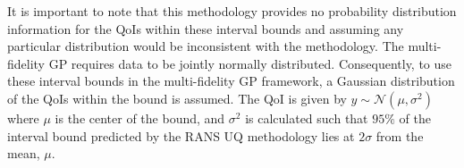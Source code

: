It is important to note that this methodology provides no probability distribution information for the QoIs within these interval bounds and assuming any particular distribution would be inconsistent with the methodology.
The multi-fidelity GP requires data to be jointly normally distributed. Consequently, to use these interval bounds in the multi-fidelity GP framework, a Gaussian distribution of the QoIs within the bound is assumed.
The QoI is given by $y \sim \mathcal{N}(\mu,\sigma^2)$ where $\mu$ is the center of the bound, and $\sigma^2$ is calculated such that $95\%$ of the interval bound predicted by the RANS UQ methodology lies at $2\sigma$ from the mean, $\mu$.